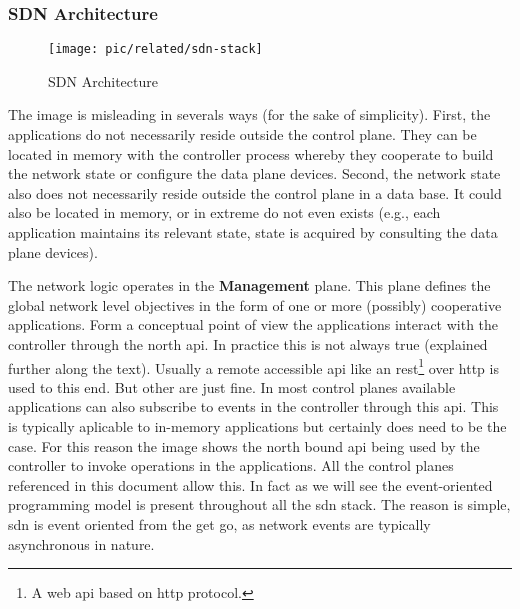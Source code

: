 \subsubsection{SDN Architecture}

\begin{figure}
  \centering
    \texttt{[image: pic/related/sdn-stack]}
  \caption{SDN Architecture}
  \label{fig:related:sdn-stack}
\end{figure}

The image is misleading in severals ways (for the sake of simplicity). First, the applications do not necessarily reside outside the control plane. They can be located in memory with the controller process whereby they cooperate to build the network state or configure the data plane devices. Second, the network state also does not necessarily reside outside the control plane in a data base. It could also be located in memory, or in extreme do not even exists (e.g., each application maintains its relevant state, state is acquired by consulting the data plane devices). 


The network logic operates in the \textbf{Management} plane. 
This plane defines the global network level objectives in the form of one or more (possibly) cooperative applications. 
Form a conceptual point of view  the applications interact with the controller through the north \gls{api}.  In practice this is not always true (explained further along the text). Usually a remote accessible api like an \gls{rest}\footnote{A web \gls{api} based on \gls{http} protocol.} over \gls{http} is used to this end. But other  are just fine. In most control planes available applications can also subscribe to events in the controller through this \gls{api}. This is typically aplicable to in-memory applications but certainly does need to be the case. For this reason the image shows the north bound \gls{api} being used by the controller to  invoke operations in the applications. All the control planes referenced in this document allow this. In fact as we will see the event-oriented programming model is present throughout all the \gls{sdn} stack. The reason is simple, \gls{sdn} is event oriented from the get go, as network events are typically asynchronous in nature. 
 


